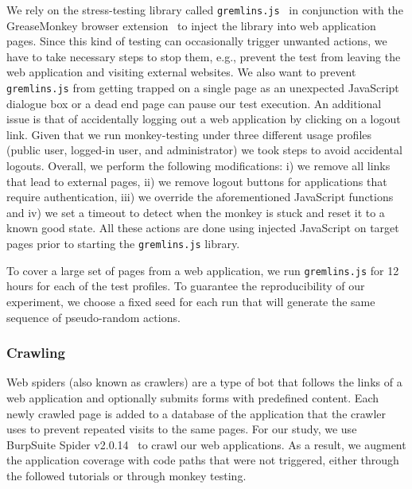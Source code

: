 We rely on the stress-testing library called
\texttt{gremlins.js}~\cite{gremlinsjs} in conjunction with the GreaseMonkey
browser extension~\cite{greasemonkey} to inject the library into web
application pages.
Since this kind of testing can occasionally trigger unwanted actions, we have
to take necessary steps to stop them, e.g., prevent the test from leaving
the web application and visiting external websites. We also want to prevent
\texttt{gremlins.js} from getting trapped on a single page as an unexpected
JavaScript
dialogue box or a dead end page can pause our test
execution.  %
An additional issue is that of accidentally logging out a web application by
clicking on a logout link. Given that we run monkey-testing under three different
usage profiles (public user, logged-in user, and administrator) we took steps
to avoid accidental logouts. Overall, we perform the following
modifications: i) we remove all links that lead to external pages, ii) we
remove logout buttons for applications that require authentication, iii) we
override the aforementioned JavaScript functions and iv) we set a timeout to
detect when the monkey is stuck and reset it to a known good state. All these
actions are done using injected JavaScript on target pages prior to starting
the \texttt{gremlins.js} library.

To cover a large set of pages from a web application, we run
\texttt{gremlins.js} for 12 hours for each of the test profiles.
To guarantee the reproducibility of our experiment, we choose a fixed seed for
each run that will generate the same sequence of pseudo-random actions.


\subsubsection{Crawling}
Web spiders (also known as crawlers) are a type of bot that follows the
links of a web application and optionally submits forms with predefined
content. Each newly crawled page is added to a database of the application that
the crawler uses to prevent repeated visits to the same pages. For our study,
we use BurpSuite Spider v2.0.14~\cite{burpsuite} to crawl our web
applications. As a result, we augment the application coverage with code paths that were
not triggered, either through the followed tutorials or through monkey testing.

